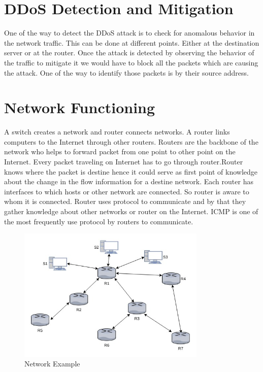 \documentclass[10pt,oneside,a4paper]{report}
\begin{document}
\chapter{DDoS Detection and Mitigation}
One of the way to detect the DDoS attack is to check for anomalous behavior in the network traffic. This can be done at different points. Either at the destination server or at the router. Once the attack is detected by observing the behavior of the traffic to mitigate it we would have to block all the packets which are causing the attack. One of the way to identify those packets is by their source address.

\chapter{Network Functioning}
A switch creates a network and router connects networks. A router links computers to the Internet through other routers. Routers are the backbone of the network who helps to forward packet from one point to other point on the Internet. Every packet traveling on Internet has to go through router\cite{swithcrouter}.Router knows where the packet is destine hence it could serve as first point of knowledge about the change in the flow information for a destine network. Each router has interfaces to which hosts or other network are connected. So router is aware to whom it is connected. Router uses protocol to communicate and by that they gather knowledge about other networks or router on the Internet. ICMP\cite{icmp} is one of the most frequently use protocol by routers to communicate.\par

\begin{figure}[H]
  \label{fig:Routers}
  \centering
    \includegraphics[width=0.80\textwidth]{Routers}
    \caption{Network Example}
\end{figure}
\end{document}

